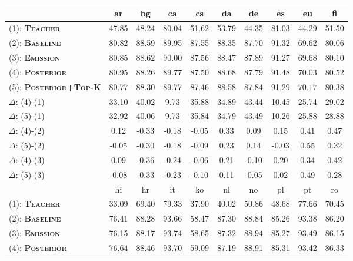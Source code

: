 \documentclass[11pt,a4paper]{article}
\begin{document}
\begin{table*}[t]
\centering
\small
\begin{tabular}{l|ccccccccc}
\hline
\hline
& ar & bg & ca & cs & da & de & es & eu & fi  \\
\hline
(1): {\bf\textsc{Teacher}}  & 47.85 & 48.24 & 80.04 & 51.62 & 53.79 & 44.35 & 81.03 & 44.29 & 51.50 \\
(2): {\bf\textsc{Baseline}}  & 80.82 & 88.59 & 89.95 & 87.55 & 88.35 & 87.70 & 91.32 & 69.62 & 80.06 \\
(3): {\bf\textsc{Emission}}  & 80.85 & $\mathbf{88.62}$ & 90.00 & $\mathbf{87.56}$ & 88.47 & $\mathbf{87.89}$ & 91.27 & 69.68 & 80.10 \\
(4): {\bf\textsc{Posterior}}  & $\mathbf{80.95}$ & 88.26 & 89.77 & 87.50 & $\mathbf{88.68}$ & 87.79 & $\mathbf{91.48}$ & 70.03 & $\mathbf{80.52}$ \\
(5): {\bf\textsc{Posterior+Top-K}}  & 80.77 & 88.30 & 89.77 & 87.46 & 88.58 & 87.84 & 91.29 & $\mathbf{70.17}$ & 80.38 \\
\hline
$\Delta$: (4)-(1) & 33.10 & 40.02 & 9.73 & 35.88 & 34.89 & 43.44 & 10.45 & 25.74 & 29.02 \\
$\Delta$: (5)-(1) & 32.92 & 40.06 & 9.73 & 35.84 & 34.79 & 43.49 & 10.26 & 25.88 & 28.88 \\
$\Delta$: (4)-(2) & 0.12 & -0.33 & -0.18 & -0.05 & 0.33 & 0.09 & 0.15 & 0.41 & 0.47 \\
$\Delta$: (5)-(2) & -0.05 & -0.30 & -0.18 & -0.09 & 0.23 & 0.14 & -0.03 & 0.55 & 0.32 \\
$\Delta$: (4)-(3) & 0.09 & -0.36 & -0.24 & -0.06 & 0.21 & -0.10 & 0.20 & 0.34 & 0.42 \\
$\Delta$: (5)-(3) & -0.08 & -0.33 & -0.23 & -0.10 & 0.11 & -0.05 & 0.02 & 0.49 & 0.28 \\
 \hline\hline
 & hi & hr & it & ko & nl & no & pl & pt & ro \\
 \hline
(1): {\bf\textsc{Teacher}}  & 33.09 & 69.40 & 79.33 & 37.90 & 40.02 & 50.86 & 48.68 & 77.66 & 70.45 \\
(2): {\bf\textsc{Baseline}}  & 76.41 & 88.28 & 93.66 & 58.47 & 87.30 & 88.84 & 85.26 & 93.38 & 86.20 \\
(3): {\bf\textsc{Emission}}  & 76.15 & 88.17 & 93.74 & 58.65 & $\mathbf{87.32}$ & $\mathbf{88.94}$ & 85.27 & $\mathbf{93.49}$ & 86.15 \\
(4): {\bf\textsc{Posterior}}  & $\mathbf{76.64}$ & $\mathbf{88.46}$ & 93.70 & $\mathbf{59.09}$ & 87.19 & 88.91 & 85.31 & 93.42 & 86.33 \\

\end{tabular}
\end{table*}
\end{document}
